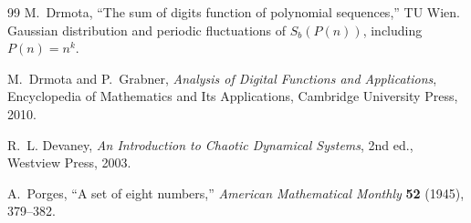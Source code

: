 \documentclass[11pt]{article}
\theoremstyle{definition}
\theoremstyle{remark}
\begin{document}
\begin{thebibliography}{99}
 M.~Drmota, ``The sum of digits function of polynomial sequences,'' TU Wien. Gaussian distribution and periodic fluctuations of $S_b(P(n))$, including $P(n) = n^k$.

 M.~Drmota and P.~Grabner, \emph{Analysis of Digital Functions and Applications}, Encyclopedia of Mathematics and Its Applications, Cambridge University Press, 2010.

 R.~L. Devaney, \emph{An Introduction to Chaotic Dynamical Systems}, 2nd ed., Westview Press, 2003.

 A.~Porges, ``A set of eight numbers,'' \emph{American Mathematical Monthly} \textbf{52} (1945), 379--382.

\end{thebibliography}
\end{document}
